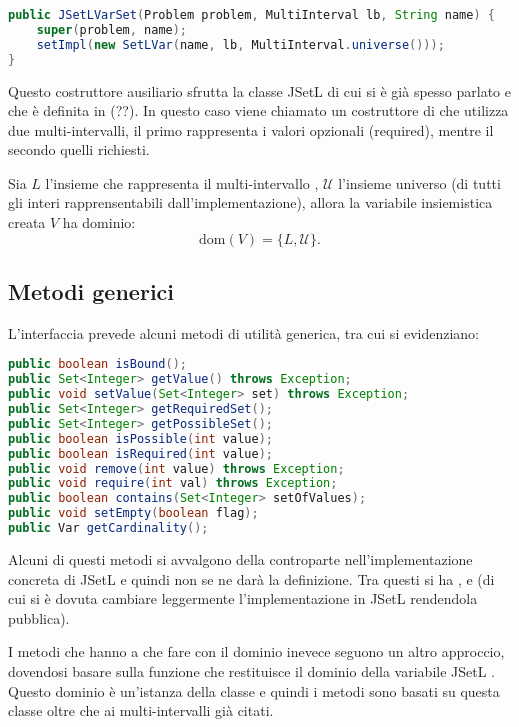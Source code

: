 \begin{lstlisting}[language = Java,
                   caption = {costruttore con un multi-intervallo.}]
public JSetLVarSet(Problem problem, MultiInterval lb, String name) {
	super(problem, name);
	setImpl(new SetLVar(name, lb, MultiInterval.universe()));
}
\end{lstlisting}
Questo costruttore ausiliario sfrutta la classe JSetL 
di cui si è già spesso parlato e che è definita in (??). In questo caso
viene chiamato un costruttore di  che utilizza due 
multi-intervalli, il primo rappresenta i valori opzionali (required), mentre
il secondo quelli richiesti.

Sia $L$ l'insieme che rappresenta il multi-intervallo , $\mathcal{U}$
l'insieme universo (di tutti gli interi rapprensentabili dall'implementazione),
allora la variabile insiemistica creata $V$ ha dominio:
\[
\textrm{dom}(V) = \{ L, \mathcal{U} \}.
\] 

\subsection{Metodi generici}
L'interfaccia  prevede alcuni metodi di utilità generica, tra cui
si evidenziano:
\begin{lstlisting}[language = Java,frame = single]
public boolean isBound();
public Set<Integer> getValue() throws Exception;
public void setValue(Set<Integer> set) throws Exception;
public Set<Integer> getRequiredSet();
public Set<Integer> getPossibleSet();
public boolean isPossible(int value);
public boolean isRequired(int value);
public void remove(int value) throws Exception;
public void require(int val) throws Exception;
public boolean contains(Set<Integer> setOfValues);
public void setEmpty(boolean flag);
public Var getCardinality();
\end{lstlisting}
Alcuni di questi metodi si avvalgono della controparte nell'implementazione
concreta di JSetL e quindi non se ne darà la definizione. Tra questi
si ha ,  e  (di cui si è
dovuta cambiare leggermente l'implementazione in JSetL rendendola pubblica).

I metodi che hanno a che fare con il dominio inevece seguono un altro approccio,
dovendosi basare sulla funzione  che restituisce il
dominio della variabile JSetL . Questo dominio è
un'istanza della classe  e quindi i metodi sono basati su
questa classe oltre che ai multi-intervalli già citati.

